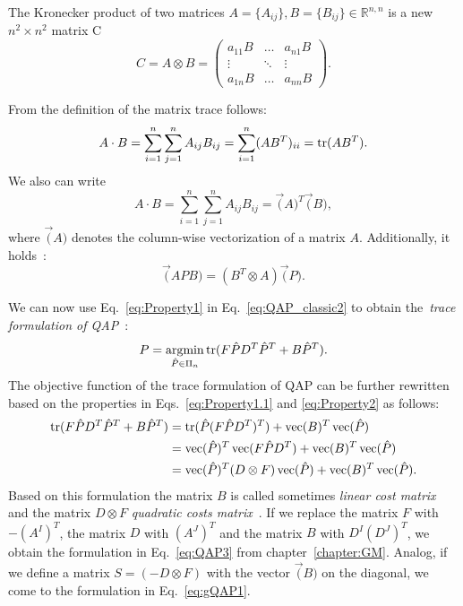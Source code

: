 The Kronecker  product of two matrices $A=\{A_{ij}\},B=\{B_{ij}\}\in\mathbb{R}^{n,n}$ is a new $n^2\times n^2$ matrix C
\begin{equation}\label{eq:kronecker}
C=A\otimes B =  	
\begin{pmatrix} a_{11}B & \dots & a_{n1}B \\ \vdots & \ddots & \vdots \\ a_{1n}B & \dots & a_{nn}B  \end{pmatrix}.
\end{equation}

From the definition of the matrix trace follows:
\begin{equation}\label{eq:Property1}
A\cdot B=\sum_{i=1}^{n}\sum_{j=1}^{n}A_{ij}B_{ij}=\sum_{i=1}^{n}(AB^T)_{ii}=\mathop{\rm tr}(AB^T).
\end{equation}
We also can write
\begin{equation}\label{eq:Property1.1}
A\cdot B=\sum_{i=1}^{n}\sum_{j=1}^{n}A_{ij}B_{ij}=\vec(A)^T\vec(B),
\end{equation}
where $\vec(A)$ denotes the column-wise vectorization of a matrix $A$. Additionally, it holds~\cite{Jain1989}:
\begin{equation}\label{eq:Property2}
\vec(APB)=(B^T\otimes A)\vec(P).
\end{equation}

We can now use Eq.~\eqref{eq:Property1} in Eq.~\eqref{eq:QAP_classic2} to obtain the~\emph{trace formulation of QAP}~\cite{Burkard98thequadratic}:
\begin{equation}\label{eq:QAP_classic3}
P = \mathop{\rm argmin}_{\hat{P}\in\Pi_n}\mathop{\rm tr}(F\hat{P}D^T\hat{P}^T+B\hat{P}^T).
\end{equation}
The objective function of the trace formulation of QAP can be further rewritten based on the properties in Eqs.~\eqref{eq:Property1.1} and \eqref{eq:Property2} as follows:
 \begin{align}\label{eq:QAP_classic4}
\mathop{\rm tr}(F\hat{P}D^T\hat{P}^T+B\hat{P}^T)&=\mathop{\rm tr}(\hat{P}(F\hat{P}D^T)^T)+\mathop{\rm vec}(B)^T\mathop{\rm vec}(\hat{P}) \notag\\	
									&=\mathop{\rm vec}(\hat{P})^T\mathop{\rm vec}(F\hat{P}D^T)+\mathop{\rm vec}(B)^T\mathop{\rm vec}(\hat{P}) \notag\\	
                                    &=\mathop{\rm vec}(\hat{P})^T(D\otimes F)\mathop{\rm vec}({\hat{P}})+\mathop{\rm vec}(B)^T\mathop{\rm vec}(\hat{P}).
\end{align}
Based on this formulation the matrix $B$ is called sometimes \emph{linear cost matrix} and the matrix $D\otimes F$ \emph{quadratic costs matrix}~\cite{Burkard98thequadratic,Roth2001}. If we replace the matrix $F$ with $-(A^I)^T$, the matrix $D$ with $(A^J)^T$ and the matrix $B$ with $D^I(D^J)^T$, we obtain the formulation in Eq.~\eqref{eq:QAP3} from chapter~\ref{chapter:GM}. Analog, if we define a matrix $S=(-D\otimes F)$ with the vector $\vec(B)$ on the diagonal, we come to the formulation in Eq.~\eqref{eq:gQAP1}.

